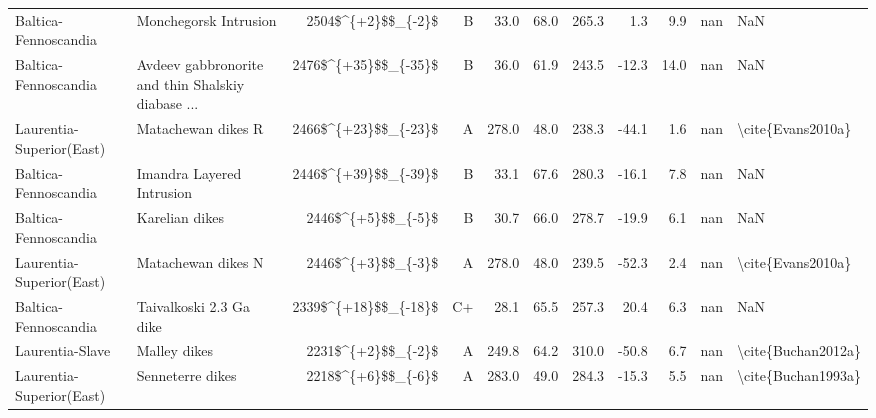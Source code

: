 \begin{longtable}{p{1 in}p{1 in}rrrrrrrr}
          Baltica-Fennoscandia &                              Monchegorsk Intrusion &     2504\$\textasciicircum \{+2\}\$\$\_\{-2\}\$ &      B &      33.0 &      68.0 & 265.3 &   1.3 &       9.9 &         nan &                                                NaN \\
          Baltica-Fennoscandia &  Avdeev gabbronorite and thin Shalskiy diabase ... &   2476\$\textasciicircum \{+35\}\$\$\_\{-35\}\$ &      B &      36.0 &      61.9 & 243.5 & -12.3 &      14.0 &         nan &                                                NaN \\
      Laurentia-Superior(East) &                                 Matachewan dikes R &   2466\$\textasciicircum \{+23\}\$\$\_\{-23\}\$ &      A &     278.0 &      48.0 & 238.3 & -44.1 &       1.6 &         nan &                                  \textbackslash cite\{Evans2010a\} \\
          Baltica-Fennoscandia &                          Imandra Layered Intrusion &   2446\$\textasciicircum \{+39\}\$\$\_\{-39\}\$ &      B &      33.1 &      67.6 & 280.3 & -16.1 &       7.8 &         nan &                                                NaN \\
          Baltica-Fennoscandia &                                     Karelian dikes &     2446\$\textasciicircum \{+5\}\$\$\_\{-5\}\$ &      B &      30.7 &      66.0 & 278.7 & -19.9 &       6.1 &         nan &                                                NaN \\
      Laurentia-Superior(East) &                                 Matachewan dikes N &     2446\$\textasciicircum \{+3\}\$\$\_\{-3\}\$ &      A &     278.0 &      48.0 & 239.5 & -52.3 &       2.4 &         nan &                                  \textbackslash cite\{Evans2010a\} \\
          Baltica-Fennoscandia &                            Taivalkoski 2.3 Ga dike &   2339\$\textasciicircum \{+18\}\$\$\_\{-18\}\$ &     C+ &      28.1 &      65.5 & 257.3 &  20.4 &       6.3 &         nan &                                                NaN \\
               Laurentia-Slave &                                       Malley dikes &     2231\$\textasciicircum \{+2\}\$\$\_\{-2\}\$ &      A &     249.8 &      64.2 & 310.0 & -50.8 &       6.7 &         nan &                                 \textbackslash cite\{Buchan2012a\} \\
      Laurentia-Superior(East) &                                   Senneterre dikes &     2218\$\textasciicircum \{+6\}\$\$\_\{-6\}\$ &      A &     283.0 &      49.0 & 284.3 & -15.3 &       5.5 &         nan &                                 \textbackslash cite\{Buchan1993a\} \\

\end{longtable}
